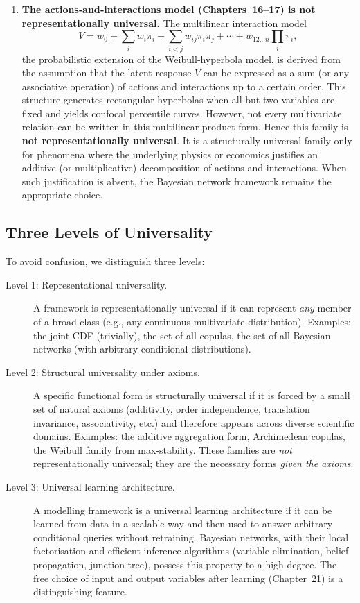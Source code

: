 \begin{enumerate}
    \item \textbf{The actions‑and‑interactions model (Chapters~16–17) is not representationally universal.}
    The multilinear interaction model
    \[
    V = w_0 + \sum_i w_i\pi_i + \sum_{i<j} w_{ij}\pi_i\pi_j + \cdots + w_{12\ldots n}\prod_i\pi_i,
    \]
    the probabilistic extension of the Weibull‑hyperbola model, is derived from the assumption that the latent response $V$ can be expressed as a sum (or any associative operation) of actions and interactions up to a certain order. This structure generates rectangular hyperbolas when all but two variables are fixed and yields confocal percentile curves. However, not every multivariate relation can be written in this multilinear product form. Hence this family is \textbf{not representationally universal}. It is a structurally universal family only for phenomena where the underlying physics or economics justifies an additive (or multiplicative) decomposition of actions and interactions. When such justification is absent, the Bayesian network framework remains the appropriate choice.

\end{enumerate}

\subsection{Three Levels of Universality}

To avoid confusion, we distinguish three levels:

\begin{description}
    \item[Level 1: Representational universality.] A framework is representationally universal if it can represent \emph{any} member of a broad class (e.g., any continuous multivariate distribution). Examples: the joint CDF (trivially), the set of all copulas, the set of all Bayesian networks (with arbitrary conditional distributions).

    \item[Level 2: Structural universality under axioms.] A specific functional form is structurally universal if it is forced by a small set of natural axioms (additivity, order independence, translation invariance, associativity, etc.) and therefore appears across diverse scientific domains. Examples: the additive aggregation form, Archimedean copulas, the Weibull family from max‑stability. These families are \emph{not} representationally universal; they are the necessary forms \emph{given the axioms}.

    \item[Level 3: Universal learning architecture.] A modelling framework is a universal learning architecture if it can be learned from data in a scalable way and then used to answer arbitrary conditional queries without retraining. Bayesian networks, with their local factorisation and efficient inference algorithms (variable elimination, belief propagation, junction tree), possess this property to a high degree. The free choice of input and output variables after learning (Chapter~21) is a distinguishing feature.
\end{description}

